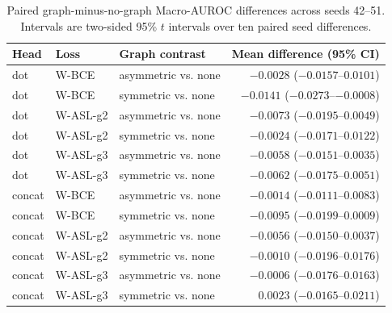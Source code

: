 \begin{table}[!t]
\centering
\caption{Paired graph-minus-no-graph Macro-AUROC differences across seeds 42--51. Intervals are two-sided 95\% $t$ intervals over ten paired seed differences.}
\label{tab:gcn_paired_r1}
\small
\begin{tabular}{lll r}
\toprule
Head & Loss & Graph contrast & Mean difference (95\% CI) \\
\midrule
dot & W-BCE & asymmetric vs. none & $-0.0028$ ($-0.0157$--$0.0101$) \\
dot & W-BCE & symmetric vs. none & $-0.0141$ ($-0.0273$--$-0.0008$) \\
dot & W-ASL-g2 & asymmetric vs. none & $-0.0073$ ($-0.0195$--$0.0049$) \\
dot & W-ASL-g2 & symmetric vs. none & $-0.0024$ ($-0.0171$--$0.0122$) \\
dot & W-ASL-g3 & asymmetric vs. none & $-0.0058$ ($-0.0151$--$0.0035$) \\
dot & W-ASL-g3 & symmetric vs. none & $-0.0062$ ($-0.0175$--$0.0051$) \\
concat & W-BCE & asymmetric vs. none & $-0.0014$ ($-0.0111$--$0.0083$) \\
concat & W-BCE & symmetric vs. none & $-0.0095$ ($-0.0199$--$0.0009$) \\
concat & W-ASL-g2 & asymmetric vs. none & $-0.0056$ ($-0.0150$--$0.0037$) \\
concat & W-ASL-g2 & symmetric vs. none & $-0.0010$ ($-0.0196$--$0.0176$) \\
concat & W-ASL-g3 & asymmetric vs. none & $-0.0006$ ($-0.0176$--$0.0163$) \\
concat & W-ASL-g3 & symmetric vs. none & $0.0023$ ($-0.0165$--$0.0211$) \\
\bottomrule
\end{tabular}
\end{table}
